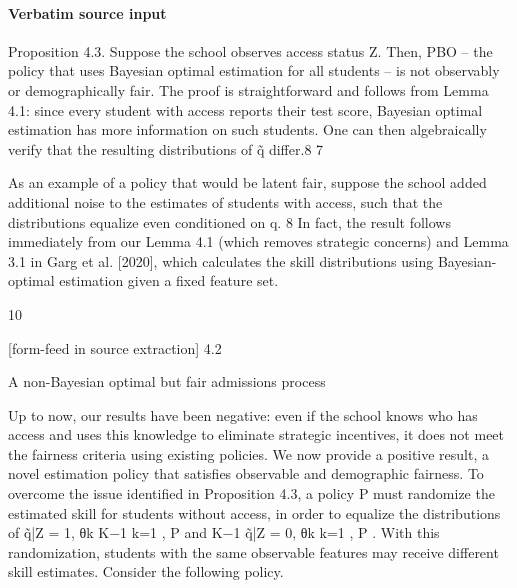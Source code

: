 \documentclass[10pt]{article}
\begin{document}
\paragraph{Verbatim source input}
\begin{ReviewVerbatim}
Proposition 4.3. Suppose the school observes access status Z. Then, PBO – the policy that uses
Bayesian optimal estimation for all students – is not observably or demographically fair.
The proof is straightforward and follows from Lemma 4.1: since every student with access reports
their test score, Bayesian optimal estimation has more information on such students. One can then
algebraically verify that the resulting distributions of q̃ diﬀer.8
7

As an example of a policy that would be latent fair, suppose the school added additional noise to the estimates
of students with access, such that the distributions equalize even conditioned on q.
8
In fact, the result follows immediately from our Lemma 4.1 (which removes strategic concerns) and Lemma 3.1
in Garg et al. [2020], which calculates the skill distributions using Bayesian-optimal estimation given a fixed feature
set.

10


[form-feed in source extraction]
4.2

A non-Bayesian optimal but fair admissions process

Up to now, our results have been negative: even if the school knows who has access and uses this
knowledge to eliminate strategic incentives, it does not meet the fairness criteria using existing
policies. We now provide a positive result, a novel estimation policy that satisﬁes observable and
demographic fairness.
To overcome the issue identiﬁed in Proposition 4.3, a policy P must randomize the estimated
skill for students without access, in order to equalize the distributions of q̃|Z = 1, {θk }K−1
k=1 , P and
K−1
q̃|Z = 0, {θk }k=1 , P . With this randomization, students with the same observable features may
receive diﬀerent skill estimates. Consider the following policy.
\end{ReviewVerbatim}
\end{document}
